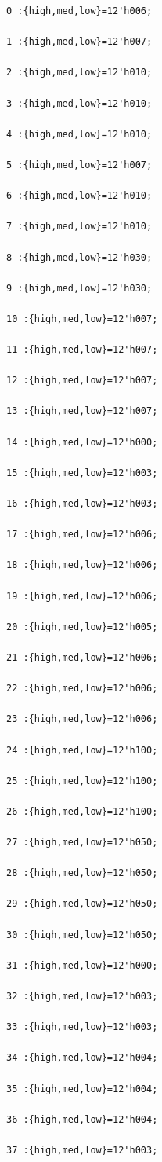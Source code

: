 \documentclass[UTF8]{ctexart}
\begin{document}
\begin{verbatim}
0 :{high,med,low}=12'h006;

1 :{high,med,low}=12'h007;

2 :{high,med,low}=12'h010;

3 :{high,med,low}=12'h010;

4 :{high,med,low}=12'h010;

5 :{high,med,low}=12'h007;

6 :{high,med,low}=12'h010;

7 :{high,med,low}=12'h010;

8 :{high,med,low}=12'h030;

9 :{high,med,low}=12'h030;

10 :{high,med,low}=12'h007;

11 :{high,med,low}=12'h007;

12 :{high,med,low}=12'h007;

13 :{high,med,low}=12'h007;

14 :{high,med,low}=12'h000;

15 :{high,med,low}=12'h003;

16 :{high,med,low}=12'h003;

17 :{high,med,low}=12'h006;

18 :{high,med,low}=12'h006;

19 :{high,med,low}=12'h006;

20 :{high,med,low}=12'h005;

21 :{high,med,low}=12'h006;

22 :{high,med,low}=12'h006;

23 :{high,med,low}=12'h006;

24 :{high,med,low}=12'h100;

25 :{high,med,low}=12'h100;

26 :{high,med,low}=12'h100;

27 :{high,med,low}=12'h050;

28 :{high,med,low}=12'h050;

29 :{high,med,low}=12'h050;

30 :{high,med,low}=12'h050;

31 :{high,med,low}=12'h000;

32 :{high,med,low}=12'h003;

33 :{high,med,low}=12'h003;

34 :{high,med,low}=12'h004;

35 :{high,med,low}=12'h004;

36 :{high,med,low}=12'h004;

37 :{high,med,low}=12'h003;


\end{verbatim}
\end{document}

